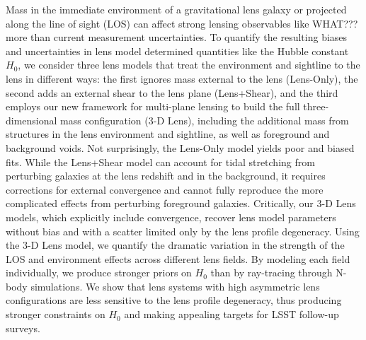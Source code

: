 Mass in the immediate environment of a gravitational lens galaxy or projected along the line of sight (LOS) can affect strong lensing observables like WHAT??? more than current measurement uncertainties. To quantify the resulting biases and uncertainties in lens model determined quantities like the Hubble constant $H_0$, we consider three lens models that treat the environment and sightline to the lens in different ways: the first ignores mass external to the lens (Lens-Only), the second adds an external shear to the lens plane (Lens+Shear), and the third employs our new 
framework for multi-plane lensing \citep{McCully14} to build the full three-dimensional mass configuration (3-D Lens), including the additional mass from structures in the lens environment and sightline, as well as foreground and background voids.  Not surprisingly, the Lens-Only model yields poor and biased fits.  While the Lens+Shear model can 
account for tidal stretching from perturbing galaxies at the lens redshift and in the background, it requires corrections for external convergence and cannot fully reproduce the more 
complicated effects from perturbing foreground galaxies.  Critically, our 3-D Lens models, which explicitly include convergence, recover lens model parameters without bias and with a scatter limited only by the lens profile degeneracy. Using the 3-D Lens model, we quantify the dramatic variation in the strength of the LOS and environment effects across different lens fields.  By modeling each field 
individually, we produce stronger priors on $H_0$ than by ray-tracing through N-body simulations.  We show that lens systems with high asymmetric lens configurations are less sensitive to the lens profile degeneracy, thus producing stronger constraints on $H_0$ and making appealing targets for LSST follow-up surveys.
  
  
  
